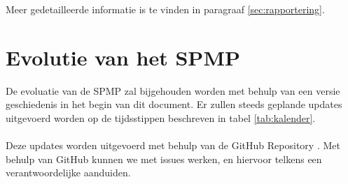 Meer gedetailleerde informatie is te vinden in paragraaf \ref{sec:rapportering}.

\section{Evolutie van het SPMP}
De evoluatie van de SPMP zal bijgehouden worden met behulp van een versie geschiedenis in het begin van dit document. Er zullen steeds geplande updates uitgevoerd worden op de tijdsstippen beschreven in tabel \ref{tab:kalender}. 
\\
\\
Deze updates worden uitgevoerd met behulp van de GitHub Repository \cite{GitHubRepository}. Met behulp van GitHub kunnen we met issues werken, en hiervoor telkens een verantwoordelijke aanduiden.